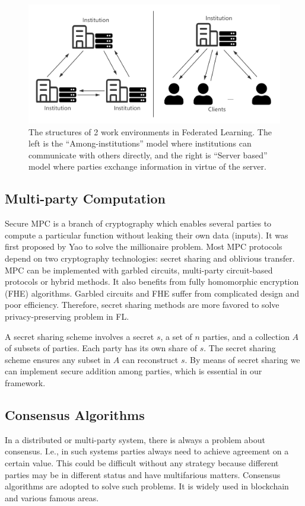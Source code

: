 \begin{figure}[!ht]
    \centering
    \includegraphics[width=\columnwidth]{img/fl_model.png}
    \caption{The structures of 2 work environments in Federated Learning. The left is the ``Among-institutions'' model where institutions can communicate with others directly, and the right is ``Server based'' model where parties exchange information in virtue of the server.}
    \label{fl_model}
\end{figure}


\subsection{Multi-party Computation}
Secure MPC is a branch of cryptography which enables several parties to compute a particular function without leaking their own data (inputs). It was first proposed by Yao to solve the millionaire problem\cite{Yao}. Most MPC protocols depend on two cryptography technologies: secret sharing\cite{Shamir} and oblivious transfer\cite{OT}. MPC can be implemented with garbled circuits, multi-party circuit-based protocols or hybrid methods\cite{mpc-sok}. It also benefits from fully homomorphic encryption (FHE) algorithms. Garbled circuits and FHE suffer from complicated design and poor efficiency. Therefore, secret sharing methods are more favored to solve privacy-preserving problem in FL.

A secret sharing scheme involves a secret $s$, a set of $n$ parties, and a collection $A$ of subsets of parties. Each party has its own share of $s$. The secret sharing scheme ensures any subset in $A$ can reconstruct $s$\cite{Secret-Sharing-survey}. By means of secret sharing we can implement secure addition among parties, which is essential in our framework.


\subsection{Consensus Algorithms}
In a distributed or multi-party system, there is always a problem about consensus. I.e., in such systems parties always need to achieve agreement on a certain value. This could be difficult without any strategy because different parties may be in different status and have multifarious matters. Consensus algorithms are adopted to solve such problems. It is widely used in blockchain and various famous areas.

